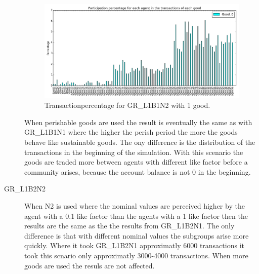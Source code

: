 \documentclass[twoside,openright]{uva-bachelor-thesis}
\begin{document}
\begin{description}
\begin{figure}[h!]
  \centering
\includegraphics[scale=0.4]{Simulation2_figures/GR_L1B2N1_1good_5k} 
  \caption{Transactionpercentage for GR\_L1B1N2 with 1 good.}
\end{figure}


When perishable goods are used the result is eventually the same as with GR\_L1B1N1 where the higher the perish period the more the goods behave like sustainable goods. The ony difference is the distribution of the transactions in the beginning of the simulation. With this scenario the goods are traded more between agents with different like factor before a community arises, because the account balance is not 0 in the beginning. 

\item[GR\_L1B2N2] When N2 is used where the nominal values are perceived higher by the agent with a 0.1 like factor than the agents with a 1 like factor then the results are the same as the the results from GR\_L1B2N1. The only difference is that with different nominal values the subgroups arise more quickly. Where it took GR\_L1B2N1 approximatly 6000 transactions it took this scnario only approximatly 3000-4000 transactions. When more goods are used the resuls are not affected.


\end{description}
\end{document}
